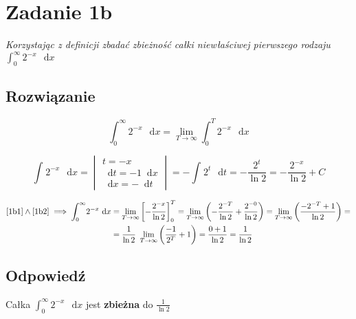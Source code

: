 \documentclass{article}
\newcommand{\diff}{\mathop{}\!\mathrm{d}}
\newcommand{\Integral}[4]{\int_{#1}^{#2} \! #3 \, \mathop{}\!\mathrm{d}#4}
\DeclareMathOperator{\?}{?}
\begin{document}
\section*{Zadanie 1b}

\textit{Korzystając z definicji zbadać zbieżność całki niewłaściwej pierwszego rodzaju $\displaystyle \Integral{0}{\infty}{2^{-x}}{x}$}

\subsection*{Rozwiązanie}

\begin{equation} \label{1b1}
   \Integral{0}{\infty}{2^{-x}}{x} = \lim_{T \to \infty}{\Integral{0}{T}{2^{-x}}{x}}
\end{equation}

\begin{equation} \label{1b2}
   \Integral{}{}{2^{-x}}{x} =
   \begin{vmatrix}
      t = -x \\
      \diff{t} = -1 \diff{x} \\
      \diff{x} = -\diff{t}
   \end{vmatrix}
   = -\Integral{}{}{2^{t}}{t}
   = -\frac{2^{t}}{\ln{2}}
   = -\frac{2^{-x}}{\ln{2}} + C
\end{equation}

\begin{equation*}
   \begin{aligned}
      \ref{1b1} \land \ref{1b2} \implies \Integral{0}{\infty}{2^{-x}}{x} & = \lim_{T \to \infty} \left[ -\frac{2^{-x}}{\ln{2}} \right]_0^{T} =
      \lim_{T \to \infty}{ \left( -\frac{2^{-T}}{\ln{2}} + \frac{2^{-0}}{\ln{2}} \right) } =
      \lim_{T \to \infty}{ \left( \frac{-2^{-T} + 1}{\ln{2}} \right) } = \\
      &= \frac{1}{\ln{2}} \ \lim_{T \to \infty}{ \left( \frac{-1}{2^T} + 1 \right) } =
      \frac{0 + 1}{\ln{2}} = \frac{1}{\ln{2}}
   \end{aligned}
\end{equation*}

\subsection*{Odpowiedź}

\centerline{Całka $\displaystyle \Integral{0}{\infty}{2^{-x}}{x}$ jest
\textbf{zbieżna} do $\displaystyle \frac{1}{\ln{2}}$}

\clearpage
\end{document}
